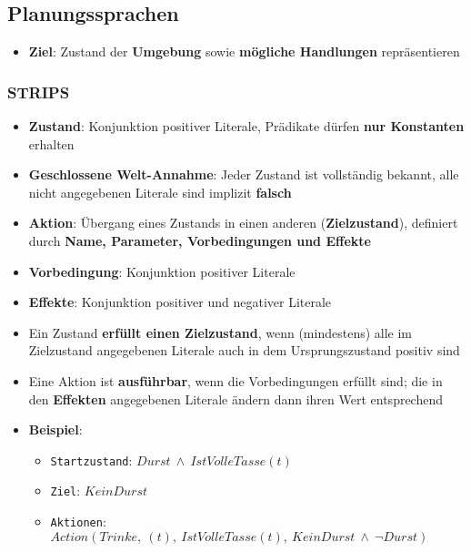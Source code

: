 \newpage
\subsection{Planungssprachen}%
\label{plan:sub:planungssprachen}

\begin{itemize}
	\item \textbf{Ziel}: Zustand der \textbf{Umgebung} sowie \textbf{mögliche Handlungen} repräsentieren
\end{itemize}

\subsubsection{STRIPS}%
\label{plan:ssub:strips}

\begin{itemize}
	\item \textbf{Zustand}: Konjunktion positiver Literale, Prädikate dürfen \textbf{nur Konstanten} erhalten
	\item \textbf{Geschlossene Welt-Annahme}: Jeder Zustand ist vollständig bekannt, alle nicht angegebenen Literale sind implizit \textbf{falsch}
	\item \textbf{Aktion}: Übergang eines Zustands in einen anderen (\textbf{Zielzustand}), definiert durch \textbf{Name, Parameter, Vorbedingungen und Effekte}
	\item \textbf{Vorbedingung}: Konjunktion positiver Literale
	\item \textbf{Effekte}: Konjunktion positiver und negativer Literale
	\item Ein Zustand \textbf{erfüllt einen Zielzustand}, wenn (mindestens) alle im Zielzustand angegebenen Literale auch in dem Ursprungszustand positiv sind
	\item Eine Aktion ist \textbf{ausführbar}, wenn die Vorbedingungen erfüllt sind; die in den \textbf{Effekten} angegebenen Literale ändern dann ihren Wert entsprechend
	\item \textbf{Beispiel}:
	\begin{itemize}
		\item \texttt{Startzustand}: $Durst\ \land\ IstVolleTasse(t)$
		\item \texttt{Ziel}: $KeinDurst$
		\item \texttt{Aktionen}: $Action(Trinke,\ (t),\ IstVolleTasse(t),\ KeinDurst\ \land\ \neg Durst)$
	\end{itemize}
\end{itemize}

